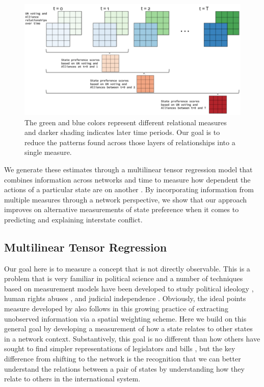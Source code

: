\documentclass[12pt,pdflatex]{elsarticle}
\begin{document}
\begin{figure}[ht]
	\centering
	\includegraphics[width=1\textwidth]{tensor_viz.pdf}
	\caption{The green and blue colors represent different relational measures and darker shading indicates later time periods. Our goal is to reduce the patterns found across those layers of relationships into a single measure.}
	\label{fig:tensViz}
\end{figure}

We generate these estimates through a multilinear tensor regression model that combines information across networks and time to measure how dependent the actions of a particular state are on another \citep{hoff:2015,minhas:etal:2016}. By incorporating information from multiple measures through a network perspective, we show that our approach improves on alternative measurements of state preference when it comes to predicting and explaining interstate conflict.

\subsection*{Multilinear Tensor Regression}

Our goal here is to measure a concept that is not directly observable. This is a problem that is very familiar in political science and a number of techniques based on measurement models have been developed to study political ideology \citep{martin:quinn:2002,konig:etal:2013}, human rights abuses \citep{fariss:2014}, and judicial independence \citep{linzer:staton:2015}. Obviously, the ideal points measure developed by \citet{bailey:etal:2015} also follows in this growing practice of extracting unobserved information via a spatial weighting scheme. Here we build on this general goal by developing a measurement of how a state relates to other states in a network context. Substantively, this goal is no different than how others have sought to find simpler representations of legislators and bills \citep{poole:rosenthal:1985,clinton:etal:2004}, but the key difference from shifting to the network is the recognition that we can better understand the relations between a pair of states by understanding how they relate to others in the international system.
\end{document}

